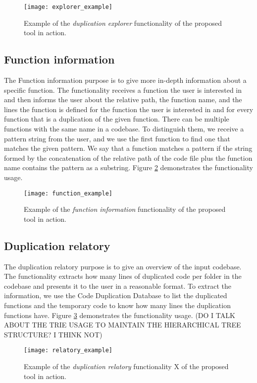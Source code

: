 \begin{figure}
\texttt{[image: explorer\_example]}
\caption{Example of the \textit{duplication explorer} functionality of the proposed tool in action.}
\label{fig:explorer_ex}
\end{figure}


\subsection{Function information}

\label{subsec:functioncommand}

The Function information purpose is to give more in-depth information about a specific 
function. The functionality receives a function the user is interested in and then 
informs the user about the relative path, the function name, and the lines the function 
is defined for the function the user is interested in and for every function that is a 
duplication of the given function. There can be multiple functions with the same name 
in a codebase. To distinguish them, we receive a pattern string from the user, and we 
use the first function to find one that matches the given pattern. We say that a 
function matches a pattern if the string formed by the concatenation of the relative 
path of the code file plus the function name contains the pattern as a substring. 
Figure \ref{fig:function_ex} demonstrates the functionality usage.

\begin{figure}
\texttt{[image: function\_example]}
\caption{Example of the \textit{function information} functionality of the proposed tool in action.}
\label{fig:function_ex}
\end{figure}


\subsection{Duplication relatory}

The duplication relatory purpose is to give an overview of the input codebase. 
The functionality extracts how many lines of duplicated code per folder in the 
codebase and presents it to the user in a reasonable format. To extract the 
information, we use the Code Duplication Database to list the duplicated functions 
and the temporary code to know how many lines the duplication functions have. 
Figure \ref{fig:relatory_ex} demonstrates the functionality usage. 
(DO I TALK ABOUT THE TRIE USAGE TO MAINTAIN THE HIERARCHICAL TREE STRUCTURE? I THINK NOT)

\begin{figure}
\texttt{[image: relatory\_example]}
\caption{Example of the \textit{duplication relatory} functionality X of the proposed tool in action.}
\label{fig:relatory_ex}
\end{figure}





